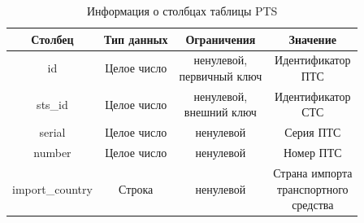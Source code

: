 
\begin{table}[H]
    \begin{center}
        \caption{Информация о столбцах таблицы PTS}
        \begin{tabular}{|c|c|c|c|}
            \hline
            Столбец & Тип данных & Ограничения & Значение \\
            \hline
            id & Целое число & \makecell{ненулевой, \\ первичный ключ} & \makecell{Идентификатор \\ ПТС} \\
            \hline
            sts\_id & Целое число & \makecell{ненулевой, \\ внешний ключ} & \makecell{Идентификатор \\ СТС} \\
            \hline
            serial & Целое число & ненулевой & Серия ПТС \\
            \hline
            number & Целое число & ненулевой & Номер ПТС \\
            \hline
            import\_country & Строка & ненулевой & \makecell{Страна импорта \\ транспортного \\ средства} \\
            \hline
        \end{tabular}
        \label{table:db:pts}
    \end{center}
\end{table}


